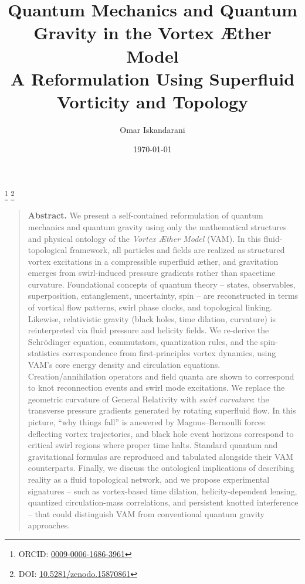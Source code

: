 \documentclass[preprint]{revtex4-2}
\begin{document}
        \title{Quantum Mechanics and Quantum Gravity in the Vortex Æther Model\\
        {\large A Reformulation Using Superfluid Vorticity and Topology}}
        \author{Omar Iskandarani}
        \thanks{ORCID: \href{https://orcid.org/0009-0006-1686-3961}{0009-0006-1686-3961}}
        \thanks{DOI: \href{https://doi.org/10.5281/zenodo.15870861}{10.5281/zenodo.15870861}}
        \date{\today}
        \maketitle
        \begin{quotation}
            \noindent\textbf{Abstract.}
                We present a self-contained reformulation of quantum mechanics and quantum gravity using only the mathematical structures and physical ontology of the \emph{Vortex Æther Model} (VAM). In this fluid-topological framework, all particles and fields are realized as structured vortex excitations in a compressible superfluid æther, and gravitation emerges from swirl-induced pressure gradients rather than spacetime curvature. Foundational concepts of quantum theory -- states, observables, superposition, entanglement, uncertainty, spin -- are reconstructed in terms of vortical flow patterns, swirl phase clocks, and topological linking. Likewise, relativistic gravity (black holes, time dilation, curvature) is reinterpreted via fluid pressure and helicity fields. We re-derive the Schrödinger equation, commutators, quantization rules, and the spin-statistics correspondence from first-principles vortex dynamics, using VAM's core energy density and circulation equations. Creation/annihilation operators and field quanta are shown to correspond to knot reconnection events and swirl mode excitations.  We replace the geometric curvature of General Relativity with \emph{swirl curvature}: the transverse pressure gradients generated by rotating superfluid flow.  In this picture, ``why things fall'' is answered by Magnus–Bernoulli forces deflecting vortex trajectories, and black hole event horizons correspond to critical swirl regions where proper time halts. Standard quantum and gravitational formulas are reproduced and tabulated alongside their VAM counterparts. Finally, we discuss the ontological implications of describing reality as a fluid topological network, and we propose experimental signatures -- such as vortex-based time dilation, helicity-dependent lensing, quantized circulation-mass correlations, and persistent knotted interference -- that could distinguish VAM from conventional quantum gravity approaches.
        \end{quotation}
\end{document}
